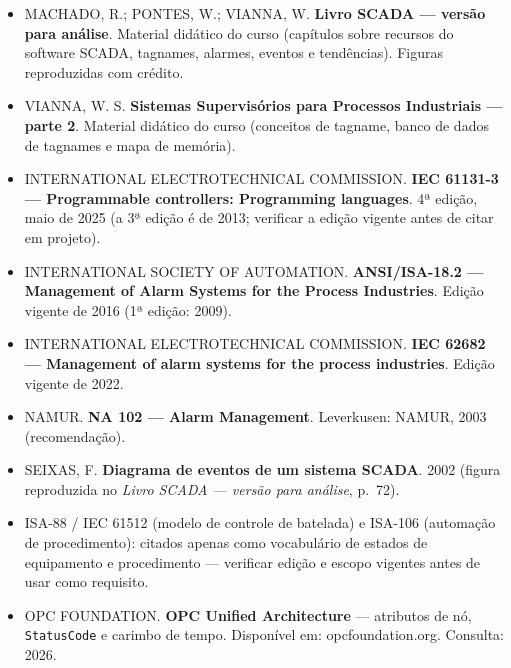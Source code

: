 \begin{itemize}
\tightlist
\item
  MACHADO, R.; PONTES, W.; VIANNA, W. \textbf{Livro SCADA --- versão para análise}. Material didático do curso (capítulos sobre recursos do software SCADA, tagnames, alarmes, eventos e tendências). Figuras reproduzidas com crédito.
\item
  VIANNA, W. S. \textbf{Sistemas Supervisórios para Processos Industriais --- parte 2}. Material didático do curso (conceitos de tagname, banco de dados de tagnames e mapa de memória).
\item
  INTERNATIONAL ELECTROTECHNICAL COMMISSION. \textbf{IEC 61131-3 --- Programmable controllers: Programming languages}. 4ª edição, maio de 2025 (a 3ª edição é de 2013; verificar a edição vigente antes de citar em projeto).
\item
  INTERNATIONAL SOCIETY OF AUTOMATION. \textbf{ANSI/ISA-18.2 --- Management of Alarm Systems for the Process Industries}. Edição vigente de 2016 (1ª edição: 2009).
\item
  INTERNATIONAL ELECTROTECHNICAL COMMISSION. \textbf{IEC 62682 --- Management of alarm systems for the process industries}. Edição vigente de 2022.
\item
  NAMUR. \textbf{NA 102 --- Alarm Management}. Leverkusen: NAMUR, 2003 (recomendação).
\item
  SEIXAS, F. \textbf{Diagrama de eventos de um sistema SCADA}. 2002 (figura reproduzida no \emph{Livro SCADA --- versão para análise}, p.~72).
\item
  ISA-88 / IEC 61512 (modelo de controle de batelada) e ISA-106 (automação de procedimento): citados apenas como vocabulário de estados de equipamento e procedimento --- verificar edição e escopo vigentes antes de usar como requisito.
\item
  OPC FOUNDATION. \textbf{OPC Unified Architecture} --- atributos de nó, \passthrough{\lstinline!StatusCode!} e carimbo de tempo. Disponível em: opcfoundation.org. Consulta: 2026.
\end{itemize}
